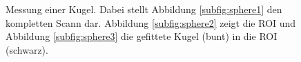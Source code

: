 \documentclass[	12pt,
				a4paper,
				bibliography=totoc,
				listof=totoc,
				index=totoc,
				twoside,
				headsepline,
				footsepline,
				ngerman]{scrartcl}
\begin{document}
\begin{appendix}
		\begin{figure}[h]
			\centering
			\caption[Messung einer Kugel]{Messung einer Kugel. Dabei stellt Abbildung \ref{subfig:sphere1} den kompletten Scann dar. Abbildung \ref{subfig:sphere2} zeigt die ROI und Abbildung \ref{subfig:sphere3} die gefittete Kugel (bunt) in die ROI (schwarz).}
			\label{fig:sphere_fit}
		\end{figure}
\end{appendix}
\cleardoublepage



\listoffigures
\clearpage

\listoftables
\clearpage
\end{document}
